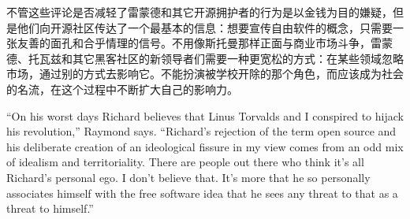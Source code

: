 \ifdefined\chs
不管这些评论是否减轻了雷蒙德和其它开源拥护者的行为是以金钱为目的嫌疑，但是他们向开源社区传达了一个最基本的信息：想要宣传自由软件的概念，只需要一张友善的面孔和合乎情理的信号。不用像斯托曼那样正面与商业市场斗争，雷蒙德、托瓦兹和其它黑客社区的新领导者们需要一种更宽松的方式：在某些领域忽略市场，通过别的方式去影响它。不能扮演被学校开除的那个角色，而应该成为社会的名流，在这个过程中不断扩大自己的影响力。
\fi





\ifdefined\eng
``On his worst days Richard believes that Linus Torvalds and I conspired to hijack his revolution,'' Raymond says. ``Richard's rejection of the term open source and his deliberate creation of an ideological fissure in my view comes from an odd mix of idealism and territoriality. There are people out there who think it's all Richard's personal ego. I don't believe that. It's more that he so personally associates himself with the free software idea that he sees any threat to that as a threat to himself.''
\fi

